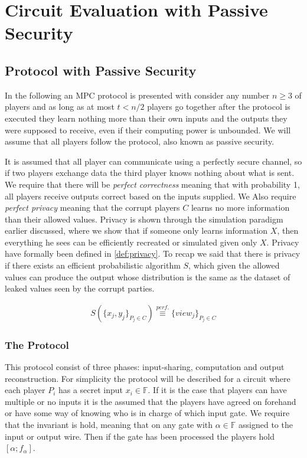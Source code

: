 \chapter{Circuit Evaluation with Passive Security}
\label{cha:CEPS}

\section{Protocol with Passive Security}
In the following an MPC protocol is presented with consider any number $n \geq 3$ of players and as long as at most $t < n/2$ players go together after the protocol is executed they learn nothing more than their own inputs and the outputs they were supposed to receive, even if their computing power is unbounded. We will assume that all players follow the protocol, also known as passive security.

It is assumed that all player can communicate using a perfectly secure channel, so if two players exchange data the third player knows nothing about what is sent. We require that there will be  \emph{perfect correctness} meaning that with probability 1, all players receive outputs correct based on the inputs supplied. We Also require \emph{perfect privacy} meaning that the corrupt players $C$ learns no more information than their allowed values. Privacy is shown through the simulation paradigm earlier discussed, where we show that if someone only learns information $X$, then everything he sees can be efficiently recreated or simulated given only $X$. Privacy have formally been defined in \ref{def:privacy}. To recap we said that there is privacy if there exists an efficient probabilistic algorithm $S$, which given the allowed values can produce the output whose distribution is the same as the dataset of leaked values seen by the corrupt parties.

\begin{align*}
    S(\{x_j,y_j\}_{P_j\in C}) \overset{perf.}{\equiv}  \{view_j\}_{P_j\in C}
\end{align*}    

\subsection{The Protocol}
This protocol consist of three phases: input-sharing, computation and output reconstruction. For simplicity the protocol will be described for a circuit where each player $P_i$ has a secret input $x_i \in \mathbb{F}$. If it is the case that players can have multiple or no inputs it is the assumed that the players have agreed on forehand or have some way of knowing who is in charge of which input gate. 
We require that the invariant is hold, meaning that on any gate with $\alpha \in \mathbb{F}$ assigned to the input or output wire. Then if the gate has been processed the players hold $[\alpha; f_\alpha]$.

